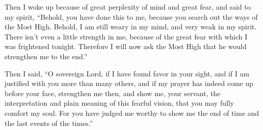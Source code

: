 Then I woke up because of great perplexity of mind and great fear, and
said to my spirit,  ``Behold, you have done this to me,
because you search out the ways of the Most High.  Behold,
I am still weary in my mind, and very weak in my spirit. There isn't
even a little strength in me, because of the great fear with which I was
frightened tonight.  Therefore I will now ask the Most
High that he would strengthen me to the end.''

 Then I said, ``O sovereign Lord, if I have found favor in
your sight, and if I am justified with you more than many others, and if
my prayer has indeed come up before your face,  strengthen
me then, and show me, your servant, the interpretation and plain meaning
of this fearful vision, that you may fully comfort my soul.
 For you have judged me worthy to show me the end of time
and the last events of the times.''

